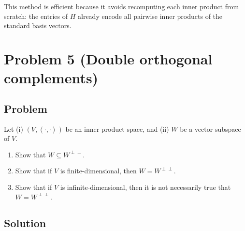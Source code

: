 \documentclass[12pt]{article}
\newcommand{\ip}[2]{\left\langle #1,#2\right\rangle}
\begin{document}
This method is efficient because it avoids recomputing each inner product from scratch: the entries of $H$ already encode all pairwise inner products of the standard basis vectors.

\newpage
\section{Problem 5 (Double orthogonal complements)}
\subsection{Problem}
Let (i) $(V,\ip{\cdot}{\cdot})$ be an inner product space, and (ii) $W$ be a vector subspace of $V$.
\begin{enumerate}[label=(\alph*)]
\item Show that $W\subseteq W^{\perp\perp}$.
\item Show that if $V$ is finite-dimensional, then $W=W^{\perp\perp}$.
\item Show that if $V$ is infinite-dimensional, then it is not necessarily true that $W=W^{\perp\perp}$.
\end{enumerate}

\subsection{Solution}
\end{document}
